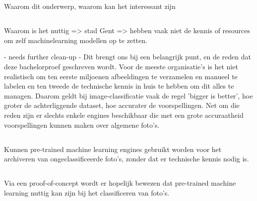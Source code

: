 
\chapter{}
\label{ch:inleiding}

Waarom dit onderwerp, waarom kan het interessant zijn

\section{}
\label{sec:probleemstelling}

Waarom is het nuttig => stad Gent => hebben vaak niet de kennis of resources om zelf machinelearning modellen op te zetten.

- needs further clean-up -
Dit brengt ons bij een belangrijk punt, en de reden dat deze bachelorproef geschreven wordt. Voor de meeste organisatie's is het niet realistisch om ten eerste miljoenen afbeeldingen te verzamelen en manueel te labelen en ten tweede de technische kennis in huis te hebben om dit alles te managen. Daarom geldt bij image-classificatie vaak de regel 'bigger is better', hoe groter de achterliggende dataset, hoe accurater de voorspellingen. 
Net om die reden zijn er slechts enkele engines beschikbaar die met een grote accuraatheid voorspellingen kunnen maken over algemene foto's.

\section{}
\label{sec:onderzoeksvraag}

Kunnen pre-trained machine learning engines gebruikt worden voor het archiveren van ongeclassificeerde foto's, zonder dat er technische kennis nodig is.

\section{}
\label{sec:onderzoeksdoelstelling}

Via een proof-of-concept wordt er hopelijk bewezen dat pre-trained machine learning nuttig kan zijn bij het classificeren van foto's.

